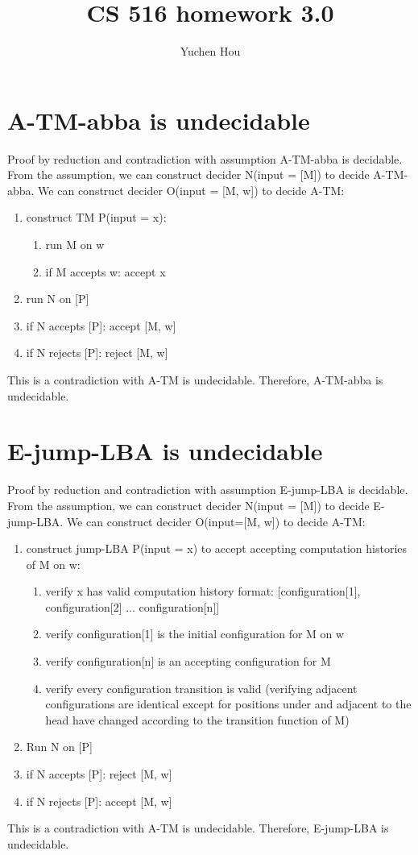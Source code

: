 \documentclass{article}
\begin{document}
\lstset{language=python, tabsize=4}
\title{CS 516 homework 3.0}
\author{Yuchen Hou}
\maketitle

\section{A-TM-abba is undecidable}
Proof by reduction and contradiction with assumption A-TM-abba is decidable. From the assumption, we can construct decider N(input = [M]) to decide A-TM-abba. We can construct decider O(input = [M, w]) to decide A-TM:
\begin{enumerate}
	\item construct TM P(input = x):
	\begin{enumerate}
		\item run M on w
		\item if M accepts w: accept x
	\end{enumerate}
	\item run N on [P]
	\item if N accepts [P]: accept [M, w]
	\item if N rejects [P]: reject [M, w]
\end{enumerate}
This is a contradiction with A-TM is undecidable. Therefore, A-TM-abba is undecidable.

\section{E-jump-LBA is undecidable}
Proof by reduction and contradiction with assumption E-jump-LBA is decidable. From the assumption, we can construct decider N(input = [M]) to decide E-jump-LBA. We can construct decider O(input=[M, w]) to decide A-TM:
\begin{enumerate}
	\item construct jump-LBA P(input = x) to accept accepting computation histories of M on w:
	\begin{enumerate}
		\item verify x has valid computation history format: [configuration[1], configuration[2] ... configuration[n]]
		\item verify configuration[1] is the initial configuration for M on w
		\item verify configuration[n] is an accepting configuration for M
		\item verify every configuration transition is valid (verifying adjacent configurations are identical except for positions under and adjacent to the head have changed according to the transition function of M)
	\end{enumerate}
	\item Run N on [P]
	\item if N accepts [P]: reject [M, w]
	\item if N rejects [P]: accept [M, w]
\end{enumerate}
This is a contradiction with A-TM is undecidable. Therefore, E-jump-LBA is undecidable.
\end{document}
